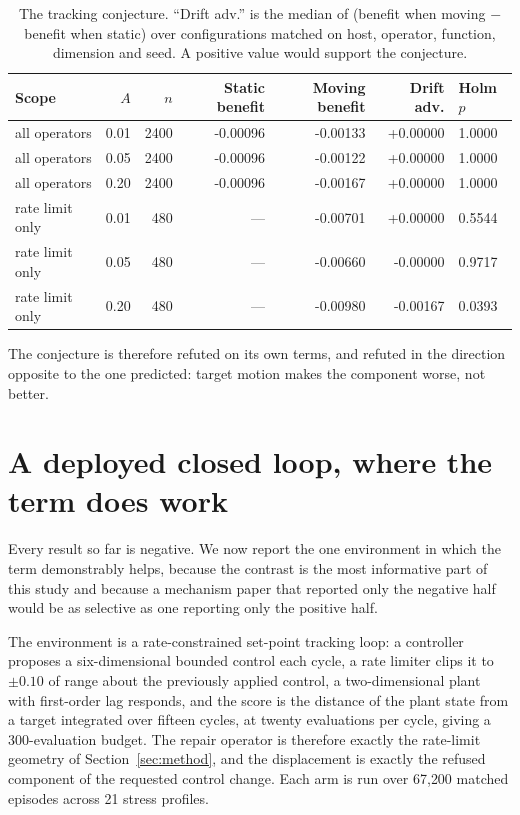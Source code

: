 \documentclass[11pt,a4paper]{article}
\begin{document}
\begin{table}[htbp]
\centering
\caption{The tracking conjecture. ``Drift adv.'' is the median of (benefit when moving
$-$ benefit when static) over configurations matched on host, operator, function,
dimension and seed. A positive value would support the conjecture.}
\label{tab:conjecture}
\small
\begin{tabular}{lrrrrrl}
\toprule
Scope & $A$ & $n$ & Static benefit & Moving benefit & Drift adv. & Holm $p$ \\
\midrule
all operators & 0.01 & 2400 & -0.00096 & -0.00133 & +0.00000 & 1.0000 \\
all operators & 0.05 & 2400 & -0.00096 & -0.00122 & +0.00000 & 1.0000 \\
all operators & 0.20 & 2400 & -0.00096 & -0.00167 & +0.00000 & 1.0000 \\
\midrule
rate limit only & 0.01 & 480 & --- & -0.00701 & +0.00000 & 0.5544 \\
rate limit only & 0.05 & 480 & --- & -0.00660 & -0.00000 & 0.9717 \\
rate limit only & 0.20 & 480 & --- & -0.00980 & -0.00167 & 0.0393 \\
\bottomrule
\end{tabular}
\end{table}

The conjecture is therefore refuted on its own terms, and refuted in the direction
opposite to the one predicted: target motion makes the component worse, not better.

\section{A deployed closed loop, where the term does work}
\label{sec:loop}

Every result so far is negative. We now report the one environment in which the term
demonstrably helps, because the contrast is the most informative part of this study and
because a mechanism paper that reported only the negative half would be as selective as
one reporting only the positive half.

The environment is a rate-constrained set-point tracking loop: a controller proposes a
six-dimensional bounded control each cycle, a rate limiter clips it to
$\pm 0.10$ of range about the previously applied control, a two-dimensional plant with
first-order lag responds, and the score is the distance of the plant state from a target
integrated over fifteen cycles, at twenty evaluations per cycle, giving a 300-evaluation
budget. The repair operator is therefore exactly the rate-limit geometry of
Section~\ref{sec:method}, and the displacement is exactly the refused component of the
requested control change. Each arm is run over 67{,}200 matched episodes across 21 stress
profiles.
\end{document}
